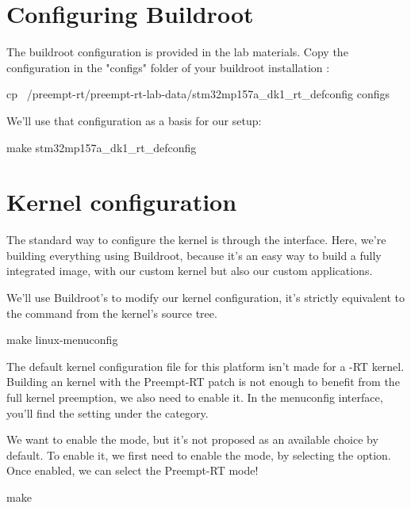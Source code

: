 \section{Configuring Buildroot}

The buildroot configuration is provided in the lab materials. Copy the configuration
in the "configs" folder of your buildroot installation :

\begin{bashinput}
	cp ~/preempt-rt/preempt-rt-lab-data/stm32mp157a_dk1_rt_defconfig configs
\end{bashinput}

We'll use that configuration as a basis for our setup:

\begin{bashinput}
make stm32mp157a_dk1_rt_defconfig
\end{bashinput}

\section{Kernel configuration}
The standard way to configure the kernel is through the  interface. Here, we're building everything using
Buildroot, because it's an easy way to build a fully integrated image, with our custom kernel but also our custom applications.

We'll use Buildroot's  to modify our kernel configuration,
it's strictly equivalent to the  command from the kernel's source tree.

\begin{bashinput}
	make linux-menuconfig
\end{bashinput}

The default kernel configuration file for this platform isn't made for a -RT kernel. Building an kernel with the Preempt-RT patch is not enough to
benefit from the full kernel preemption, we also need to enable it. In the menuconfig interface, you'll find the  setting under the  category.

We want to enable the  mode, but it's not proposed as an available choice by default. To enable it, we first need to enable the  mode, by selecting the  option. Once enabled, we can select the Preempt-RT mode!

\begin{bashinput}
make
\end{bashinput}

